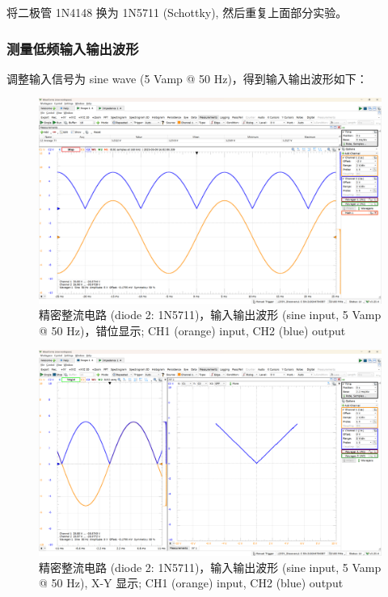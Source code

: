 \documentclass[UTF8]{article}
\begin{document}
将二极管 1N4148 换为 1N5711 (Schottky), 然后重复上面部分实验。

\subsubsection{测量低频输入输出波形}

调整输入信号为 sine wave (5 Vamp @ 50 Hz)，得到输入输出波形如下：

\begin{figure}[H]\centering
    \includegraphics[width=\columnwidth]{LCE-05-精密整流/assets/1N5711/1N5711 input-output waveform (50 Hz) 2.png}
    \vspace*{-7mm}
    \caption{精密整流电路 (diode 2: 1N5711)，输入输出波形 (sine input, 5 Vamp @ 50 Hz)，错位显示; CH1 (orange) input, CH2 (blue) output}
\end{figure}


\begin{figure}[H]\centering
    \includegraphics[width=\columnwidth]{LCE-05-精密整流/assets/1N5711/1N5711 input-output waveform (50 Hz) 3.png}
    \vspace*{-7mm}
    \caption{精密整流电路 (diode 2: 1N5711)，输入输出波形 (sine input, 5 Vamp @ 50 Hz), X-Y 显示; CH1 (orange) input, CH2 (blue) output}
\end{figure}
\end{document}
